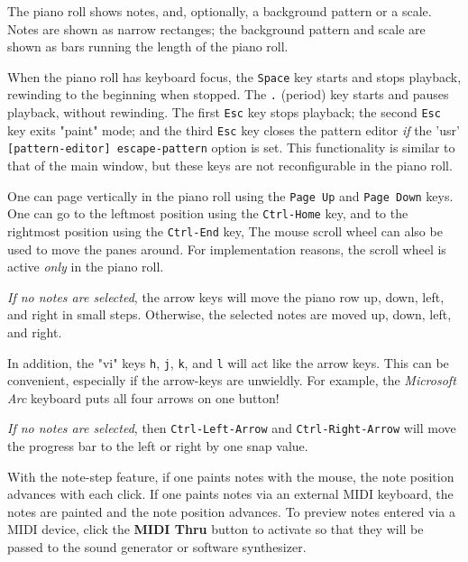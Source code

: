    The piano roll shows notes, and, optionally, a background pattern or a
   scale.  Notes are shown as narrow rectanges; the background
   pattern and scale are shown as bars running the length of the piano roll.

   When the piano roll has keyboard focus, the \texttt{Space} key
   starts and stops playback, rewinding to the beginning when stopped.
   The \texttt{.} (period) key starts and pauses playback, without
   rewinding.
   The first \texttt{Esc} key stops playback;
   the second \texttt{Esc} key exits "paint" mode; and
   the third \texttt{Esc} key closes the pattern editor \textsl{if}
   the 'usr' \texttt{[pattern-editor] escape-pattern} option is set.
   This functionality is similar to that of the main window, but
   these keys are not reconfigurable in the piano roll.

   One can page vertically in the piano roll using the
    \texttt{Page Up} and 
    \texttt{Page Down} keys.
   One can go to the leftmost position using the 
    \texttt{Ctrl-Home} key,
   and to the rightmost position using the
    \texttt{Ctrl-End} key,
   The mouse scroll wheel can also be used to move the panes around.
   For implementation reasons, the scroll wheel is active
   \textsl{only} in the piano roll.

   \textsl{If no notes are selected}, the arrow keys will move the piano row
   up, down, left, and right in small steps.
   Otherwise, the selected notes are moved
   up, down, left, and right.

   In addition, the "vi" keys \texttt{h}, \texttt{j}, \texttt{k}, and
   \texttt{l} will act like the arrow keys. This can be convenient, especially
   if the arrow-keys are unwieldly.  For example, the
   \textsl{Microsoft Arc} keyboard puts all four arrows on one button!

   \textsl{If no notes are selected}, then \texttt{Ctrl-Left-Arrow}
   and \texttt{Ctrl-Right-Arrow} will move the progress bar to the left or
   right by one snap value.

   With the note-step feature, if one paints notes with the mouse,
   the note position advances with each click.
   If one paints notes via an external MIDI keyboard, the notes are painted and
   the note position advances.
   To preview notes entered via a MIDI device, click the
   \textbf{MIDI Thru} button to activate so that they will be
   passed to the sound generator or software synthesizer.

